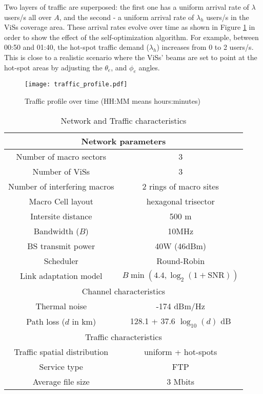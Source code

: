 \documentclass[conference]{IEEEtran}
\begin{document}
	Two layers of traffic are superposed: the first one has a uniform arrival rate of $\lambda$ users/s all over $A$, and the second - a uniform arrival rate of $\lambda_h$ users/s in the \acp{ViS} coverage area. These arrival rates evolve over time as shown in Figure \ref{fig:traff} in order to show the effect of the self-optimization algorithm. For example, between 00:50 and 01:40, the hot-spot traffic demand ($\lambda_h$) increases from 0 to 2 users/s. This is close to a realistic scenario where the \acp{ViS}' beams are set to point at the hot-spot areas by adjusting the $\theta_e$, and $\phi_e$ angles.

\begin{figure}[!ht]
\centering
\texttt{[image: traffic\_profile.pdf]}
\caption{Traffic profile over time (HH:MM means hours:minutes)}
\label{fig:traff}
\end{figure}

\begin{table}[!t]
\small
\renewcommand{\arraystretch}{1.3}
\caption{Network and Traffic characteristics}
\label{tab:params}
\centering
\begin{tabular}{|c|c|}
\hline
\multicolumn{2}{|c|}{Network parameters} \\
\hline
Number of macro sectors & 3 \\
\hline
Number of \acp{ViS} & 3 \\
\hline
Number of interfering macros & 2 rings of macro sites \\
\hline
Macro Cell layout & hexagonal trisector \\
\hline
Intersite distance & 500 m \\
\hline
Bandwidth ($B$) & 10MHz \\
\hline
\ac{BS} transmit power & 40W (46dBm) \\
\hline
Scheduler & Round-Robin \\
\hline
Link adaptation model & $B\min(4.4,\log_2(1+\text{SNR}))$ \cite{3gpp_evolveduniversalterrestrial_2012} \\
\hline
\multicolumn{2}{|c|}{Channel characteristics} \\
\hline
Thermal noise & -174 dBm/Hz \\
\hline
Path loss ($d$ in km) & 128.1 + 37.6 $\log_{10}(d)$ dB \\
\hline
\multicolumn{2}{|c|}{Traffic characteristics} \\
\hline
Traffic spatial distribution & uniform + hot-spots \\
\hline
Service type & FTP \\
\hline
Average file size & 3 Mbits \\
\hline
\end{tabular}
\end{table}
\end{document}
